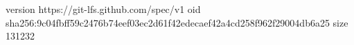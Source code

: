 version https://git-lfs.github.com/spec/v1
oid sha256:9c04fbff59c2476b74eef03ec2d61f42edecaef42a4cd258f962f29004db6a25
size 131232
